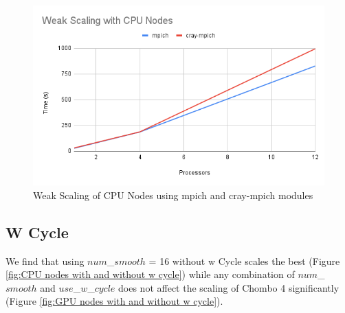 \documentclass{article}
\begin{document}
\begin{figure}[ht]
\centering
\includegraphics[width=12cm]{Weak Scaling with CPU Nodes (1.5x).png}
\caption{Weak Scaling of CPU Nodes using mpich and cray-mpich modules}
\label{fig:mpich vs cray-mpich}
\end{figure}

\subsection{W Cycle}
We find that using $num$\_$smooth$ = 16 without w Cycle scales the best (Figure \ref{fig:CPU nodes with and without w cycle}) while any combination of $num$\_$smooth$ and $use$\_$w$\_$cycle$ does not affect the scaling of Chombo 4 significantly (Figure \ref{fig:GPU nodes with and without w cycle}). 
\end{document}
